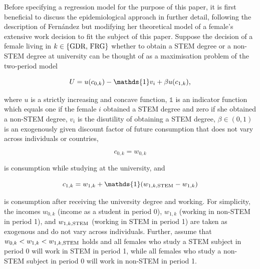 \documentclass[a4paper, oneside, hyperfootnotes = false]{article}
\begin{document}
{%
Before specifying a regression model for the purpose of this paper, it is first  beneficial to discuss the epidemiological approach in further detail, following the description of Fernández but modifying her theoretical model of a female's extensive work decision to fit the subject of this paper.
Suppose the decision of a female living in $k \in \{\textnormal{GDR, FRG}\}$ whether to obtain a STEM degree or a non-STEM degree at university can be thought of as a maximisation problem of the two-period model

\vspace{-8mm}

\begin{equation}
	\label{eq:utility}
	U = u(c_{0,k}) - \mathds{1}v_{i} + \beta{}u(c_{1,k})\textnormal{,}
\end{equation}

\noindent where $u$ is a strictly increasing and concave function, $\mathds{1}$ is an indicator function which equals one if the female $i$ obtained a STEM degree and zero if she obtained a non-STEM degree, $v_{i}$ is the disutility of obtaining a STEM degree, $\beta \in (0,1)$ is an exogenously given discount factor of future consumption that does not vary across individuals or countries,

\vspace{-8mm}

\begin{equation*}
	\label{eq:c0k}
	c_{0,k} = w_{0,k}
\end{equation*}

\noindent is consumption while studying at the university, and 

\vspace{-8mm}

\begin{equation*}
	\label{eq:c1k}
	c_{1,k} = w_{1,k} + \mathds{1}(w_{1,k,\textnormal{STEM}} - w_{1,k})
\end{equation*}

\noindent is consumption after receiving the university degree and working.
For simplicity, the incomes $w_{0,k}$ (income as a student in period 0), $w_{1,k}$ (working in non-STEM in period 1), and $w_{1,k,\textnormal{STEM}}$ (working in STEM in period 1) are taken as exogenous and do not vary across individuals.
Further, assume that $w_{0,k} < w_{1,k} < w_{1,k,\textnormal{STEM}}$ holds and all females who study a STEM subject in period 0 will work in STEM in period 1, while all females who study a non-STEM subject in period 0 will work in non-STEM in period 1.

}
\end{document}
